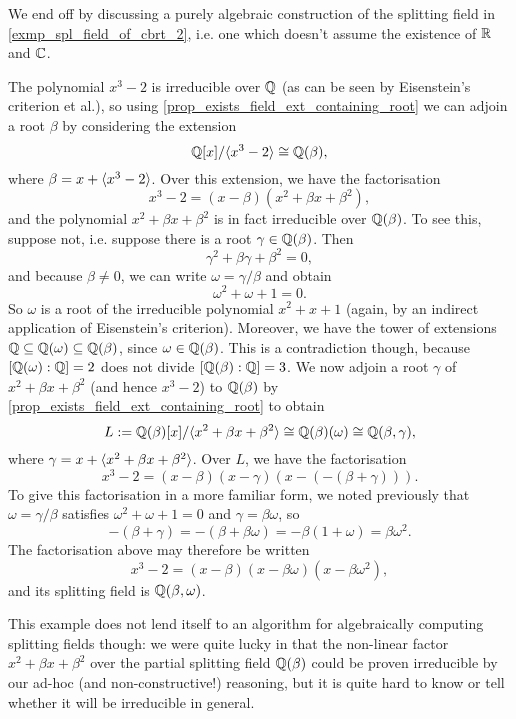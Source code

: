 We end off by discussing a purely algebraic construction of the splitting field in \cref{exmp_spl_field_of_cbrt_2}, i.e. one which doesn't assume the existence of $\mathbb{{R}}$ and $\mathbb{{C}}$.

\begin{example}
    The polynomial $x^3 - 2$ is irreducible over $\mathbb{{Q}}$ (as can be seen by Eisenstein's criterion et al.), so using \cref{prop_exists_field_ext_containing_root} we can adjoin a root $\beta$ by considering the extension
    \[
        \mathbb{{Q}}[x]/\langle {x^3 - 2} \rangle \cong \mathbb{{Q}}(\beta),
    \]
    where $\beta = x + \langle {x^3 - 2} \rangle$. Over this extension, we have the factorisation
    \[
        x^3 - 2 = (x - \beta)(x^2 + \beta x + \beta^2),
    \]
    and the polynomial $x^2 + \beta x + \beta^2$ is in fact irreducible over $\mathbb{{Q}}(\beta)$. To see this, suppose not, i.e. suppose there is a root $\gamma \in \mathbb{{Q}}(\beta)$. Then
    \[
        \gamma^2 + \beta \gamma + \beta^2 = 0,
    \]
    and because $\beta \neq 0$, we can write $\omega = \gamma / \beta$ and obtain
    \[
        \omega^2 + \omega + 1 = 0.
    \]
    So $\omega$ is a root of the irreducible polynomial $x^2 + x + 1$ (again, by an indirect application of Eisenstein's criterion). Moreover, we have the tower of extensions $\mathbb{{Q}} \subseteq \mathbb{{Q}}(\omega) \subseteq \mathbb{{Q}}(\beta)$, since $\omega \in \mathbb{{Q}}(\beta)$. This is a contradiction though, because $[\mathbb{{Q}}(\omega) : \mathbb{{Q}}] = 2$ does not divide $[\mathbb{{Q}}(\beta) : \mathbb{{Q}}] = 3$. We now adjoin a root $\gamma$ of $x^2 + \beta x + \beta^2$ (and hence $x^3 - 2$) to $\mathbb{{Q}}(\beta)$ by \cref{prop_exists_field_ext_containing_root} to obtain
    \[
        L := \mathbb{{Q}}(\beta)[x]/\langle {x^2 + \beta x + \beta^2} \rangle \cong \mathbb{{Q}}(\beta)(\omega) \cong \mathbb{{Q}}(\beta, \gamma),
    \]
    where $\gamma = x + \langle {x^2 + \beta x + \beta^2} \rangle$. Over $L$, we have the factorisation
    \[
        x^3 - 2 = (x - \beta)(x - \gamma)(x - (-(\beta + \gamma))).
    \]
    To give this factorisation in a more familiar form, we noted previously that $\omega = \gamma/\beta$ satisfies $\omega^2 + \omega + 1 = 0$ and $\gamma = \beta \omega$, so
    \[
        - (\beta + \gamma) = - (\beta + \beta \omega) = - \beta (1 + \omega) = \beta\omega^2.
    \]
    The factorisation above may therefore be written
    \[
        x^3 - 2 = (x - \beta)(x - \beta \omega)(x - \beta \omega^2),
    \]
    and its splitting field is $\mathbb{{Q}}(\beta, \omega)$.
\end{example}

\begin{remark}
    This example does not lend itself to an algorithm for algebraically computing splitting fields though: we were quite lucky in that the non-linear factor $x^2 + \beta x + \beta^2$ over the partial splitting field $\mathbb{{Q}}(\beta)$ could be proven irreducible by our ad-hoc (and non-constructive!) reasoning, but it is quite hard to know or tell whether it will be irreducible in general.
\end{remark}
